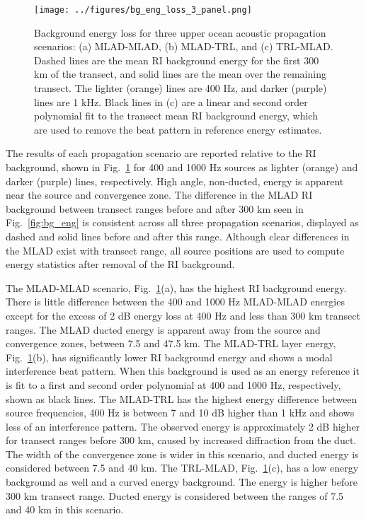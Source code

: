 \documentclass[preprint,NumberedRefs]{JASA}
\begin{document}
\begin{figure}
\texttt{[image: ../figures/bg\_eng\_loss\_3\_panel.png]}
        \caption{Background energy loss for three upper ocean acoustic propagation scenarios: (a) MLAD-MLAD, (b) MLAD-TRL, and (c) TRL-MLAD. Dashed lines are the mean RI background energy for the first 300 km of the transect, and solid lines are the mean over the remaining transect. The lighter (orange) lines are 400 Hz, and darker (purple) lines are 1 kHz. Black lines in (c) are a linear and second order polynomial fit to the transect mean RI background energy, which are used to remove the beat pattern in reference energy estimates.}
    \label{fig:eng_bg_3}
\end{figure}

The results of each propagation scenario are reported relative to the RI background, shown in Fig.~\ref{fig:eng_bg_3} for 400 and 1000 Hz sources as lighter (orange) and darker (purple) lines, respectively. High angle, non-ducted, energy is apparent near the source and convergence zone. The difference in the MLAD RI background between transect ranges before and after 300 km seen in Fig.~\ref{fig:bg_eng} is consistent across all three propagation scenarios, displayed as dashed and solid lines before and after this range. Although clear differences in the MLAD exist with transect range, all source positions are used to compute energy statistics after removal of the RI background.

The MLAD-MLAD scenario, Fig.~\ref{fig:eng_bg_3}(a), has the highest RI background energy. There is little difference between the 400 and 1000 Hz MLAD-MLAD energies except for the excess of 2 dB energy loss at 400 Hz and less than 300 km transect ranges. The MLAD ducted energy is apparent away from the source and convergence zones, between 7.5 and 47.5 km. The MLAD-TRL layer energy, Fig.~\ref{fig:eng_bg_3}(b), has significantly lower RI background energy and shows a modal interference beat pattern. When this background is used as an energy reference it is fit to a first and second order polynomial at 400 and 1000 Hz, respectively, shown as black lines. The MLAD-TRL has the highest energy difference between source frequencies, 400 Hz is between 7 and 10 dB higher than 1 kHz and shows less of an interference pattern. The observed energy is approximately 2 dB higher for transect ranges before 300 km, caused by increased diffraction from the duct. The width of the convergence zone is wider in this scenario, and ducted energy is considered between 7.5 and 40 km. The TRL-MLAD, Fig.~\ref{fig:eng_bg_3}(c), has a low energy background as well and a curved energy background. The energy is higher before 300 km transect range. Ducted energy is considered between the ranges of 7.5 and 40 km in this scenario.
\end{document}
